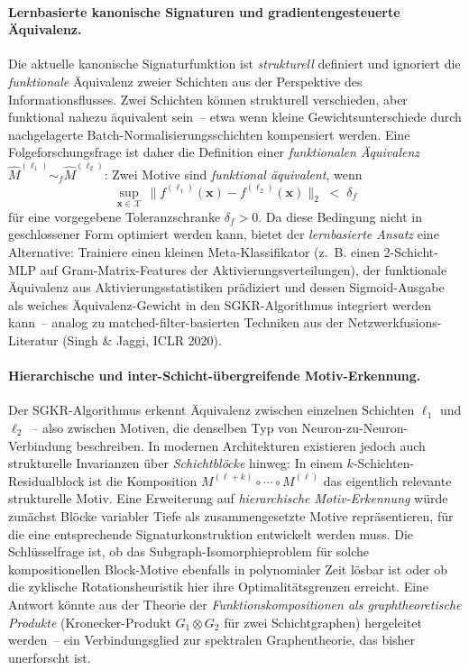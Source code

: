 ﻿\documentclass[12pt, a4paper, openany]{report}
\newcommand{\calX}{\mathcal{X}}
\begin{document}
\paragraph{Lernbasierte kanonische Signaturen und gradientengesteuerte Äquivalenz.}
Die aktuelle kanonische Signaturfunktion ist \emph{strukturell} definiert
und ignoriert die \emph{funktionale} Äquivalenz zweier Schichten aus der
Perspektive des Informationsflusses.  Zwei Schichten können strukturell
verschieden, aber funktional nahezu äquivalent sein~-- etwa wenn kleine
Gewichtsunterschiede durch nachgelagerte Batch-Normalisierungsschichten
kompensiert werden.  Eine Folgeforschungsfrage ist daher die Definition
einer \emph{funktionalen Äquivalenz}
$\hat{M}^{(\ell_1)} \sim_f \hat{M}^{(\ell_2)}$: Zwei Motive sind
\emph{funktional äquivalent}, wenn
\[
  \sup_{\bm{x} \in \calX}\,
  \bigl\| f^{(\ell_1)}(\bm{x}) - f^{(\ell_2)}(\bm{x}) \bigr\|_2
  \;<\; \delta_f
\]
für eine vorgegebene Toleranzschranke $\delta_f > 0$.  Da diese Bedingung
nicht in geschlossener Form optimiert werden kann, bietet der
\emph{lernbasierte Ansatz} eine Alternative: Trainiere einen kleinen
Meta-Klassifikator (z.~B. einen 2-Schicht-MLP auf Gram-Matrix-Features der
Aktivierungsverteilungen), der funktionale Äquivalenz aus Aktivierungsstatistiken
prädiziert und dessen Sigmoid-Ausgabe als weiches Äquivalenz-Gewicht in
den SGKR-Algorithmus integriert werden kann~-- analog zu
matched-filter-basierten Techniken aus der Netzwerkfusions-Literatur
(Singh \& Jaggi, ICLR 2020).

\paragraph{Hierarchische und inter-Schicht-übergreifende Motiv-Erkennung.}
Der SGKR-Algorithmus erkennt Äquivalenz zwischen einzelnen Schichten $\ell_1$
und $\ell_2$~-- also zwischen Motiven, die denselben Typ von
Neuron-zu-Neuron-Verbindung beschreiben.  In modernen Architekturen existieren
jedoch auch strukturelle Invarianzen über \emph{Schichtblöcke} hinweg: In
einem $k$-Schichten-Residualblock ist die Komposition
$M^{(\ell+k)} \circ \cdots \circ M^{(\ell)}$ das eigentlich relevante
strukturelle Motiv.  Eine Erweiterung auf \emph{hierarchische Motiv-Erkennung}
würde zunächst Blöcke variabler Tiefe als zusammengesetzte Motive
repräsentieren, für die eine entsprechende Signaturkonstruktion entwickelt
werden muss.  Die Schlüsselfrage ist, ob das Subgraph-Isomorphieproblem für
solche kompositionellen Block-Motive ebenfalls in polynomialer Zeit lösbar
ist oder ob die zyklische Rotationsheuristik hier ihre Optimalitätsgrenzen
erreicht.  Eine Antwort könnte aus der Theorie der \emph{Funktionskompositionen
als graphtheoretische Produkte} (Kronecker-Produkt $G_1 \otimes G_2$ für
zwei Schichtgraphen) hergeleitet werden~-- ein Verbindungsglied zur
spektralen Graphentheorie, das bisher unerforscht ist.
\end{document}

